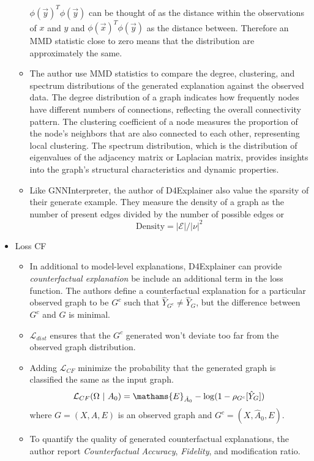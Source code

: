 \documentclass[
  11pt,
  letterpaper,
]{article}
\begin{document}
\begin{itemize}
\begin{itemize}
    \(\phi(\vec{y})^T \phi(\vec{y})\) can be thought of as the distance
    within the observations of \(x\) and \(y\) and
    \(\phi(\vec{x})^T \phi(\vec{y})\) as the distance between. Therefore
    an MMD statistic close to zero means that the distribution are
    approximately the same.
  \item
    The author use MMD statistics to compare the degree, clustering, and
    spectrum distributions of the generated explanation against the
    observed data. The degree distribution of a graph indicates how
    frequently nodes have different numbers of connections, reflecting
    the overall connectivity pattern. The clustering coefficient of a
    node measures the proportion of the node's neighbors that are also
    connected to each other, representing local clustering. The spectrum
    distribution, which is the distribution of eigenvalues of the
    adjacency matrix or Laplacian matrix, provides insights into the
    graph's structural characteristics and dynamic properties.
  \item
    Like GNNInterpreter, the author of D4Explainer also value the
    sparsity of their generate example. They measure the density of a
    graph as the number of present edges divided by the number of
    possible edges or \begin{equation}
      \text{Density} = \mathcal{|E|} / |\nu|^2
      \end{equation}
  \end{itemize}
\item
  Loss CF

  \begin{itemize}
  \item
    In additional to model-level explanations, D4Explainer can provide
    \emph{counterfactual explanation} be include an additional term in
    the loss function. The authors define a counterfactual explanation
    for a particular observed graph to be \(G^c\) such that
    \(\hat Y_{G^c} \neq \hat Y_G\), but the difference between \(G^c\)
    and \(G\) is minimal.
  \item
    \(\mathcal{L}_{dist}\) ensures that the \(G^c\) generated won't
    deviate too far from the observed graph distribution.
  \item
    Adding \(\mathcal{L}_{CF}\) minimize the probability that the
    generated graph is classified the same as the input graph.
    \begin{equation}
       \mathcal{L}_{CF}(\Omega \ | \ A_0) = 
          \mathams{E}_{\hat A_0} - \log(1 - \rho_{G^c}[\hat Y_{G}])
      \end{equation} where \(G = (X, A, E)\) is an observed graph and
    \(G^c = (X, \hat A_0, E)\).
  \item
    To quantify the quality of generated counterfactual explanations,
    the author report \emph{Counterfactual Accuracy}, \emph{Fidelity},
    and modification ratio.


\end{itemize}
\end{itemize}
\end{document}
